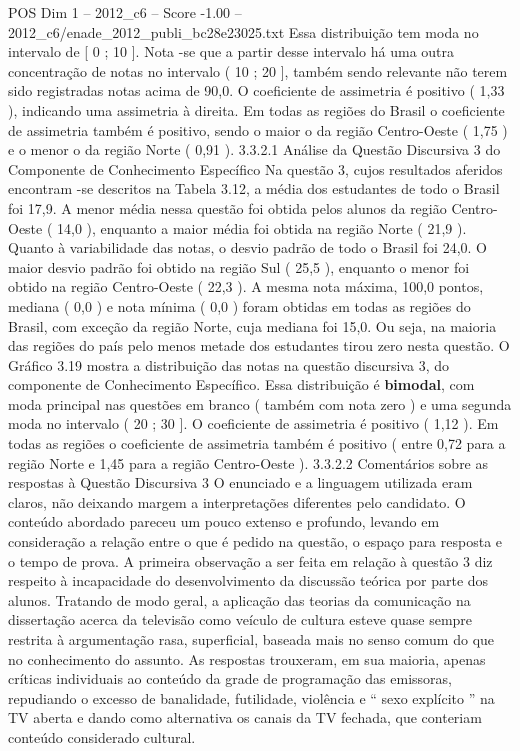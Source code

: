 \begin{textsample}{POS Dim 1 – 2012\_c6 – Score -1.00 – 2012\_c6/enade\_2012\_publi\_bc28e23025.txt}
Essa distribuição tem moda no intervalo de [ 0 ; 10 ].
Nota -se que a partir desse intervalo há uma outra concentração de notas no intervalo ( 10 ; 20 ], também sendo relevante não terem sido registradas notas acima de 90,0.
O coeficiente de assimetria é positivo ( 1,33 ), indicando uma assimetria à direita.
Em todas as regiões do Brasil o coeficiente de assimetria também é positivo, sendo o maior o da região Centro-Oeste ( 1,75 ) e o menor o da região Norte ( 0,91 ). 3.3.2.1 Análise da Questão Discursiva 3 do Componente de Conhecimento Específico Na questão 3, cujos resultados aferidos encontram -se descritos na Tabela 3.12, a média dos estudantes de todo o Brasil foi 17,9.
A menor média nessa questão foi obtida pelos alunos da região Centro-Oeste ( 14,0 ), enquanto a maior média foi obtida na região Norte ( 21,9 ).
Quanto à variabilidade das notas, o desvio padrão de todo o Brasil foi 24,0.
O maior desvio padrão foi obtido na região Sul ( 25,5 ), enquanto o menor foi obtido na região Centro-Oeste ( 22,3 ).
A mesma nota máxima, 100,0 pontos, mediana ( 0,0 ) e nota mínima ( 0,0 ) foram obtidas em todas as regiões do Brasil, com exceção da região Norte, cuja mediana foi 15,0.
Ou seja, na maioria das regiões do país pelo menos metade dos estudantes tirou zero nesta questão.
O Gráfico 3.19 mostra a distribuição das notas na questão discursiva 3, do componente de Conhecimento Específico.
Essa distribuição é \textbf{bimodal}, com moda principal nas questões em branco ( também com nota zero ) e uma segunda moda no intervalo ( 20 ; 30 ].
O coeficiente de assimetria é positivo ( 1,12 ).
Em todas as regiões o coeficiente de assimetria também é positivo ( entre 0,72 para a região Norte e 1,45 para a região Centro-Oeste ). 3.3.2.2 Comentários sobre as respostas à Questão Discursiva 3 O enunciado e a linguagem utilizada eram claros, não deixando margem a interpretações diferentes pelo candidato.
O conteúdo abordado pareceu um pouco extenso e profundo, levando em consideração a relação entre o que é pedido na questão, o espaço para resposta e o tempo de prova.
A primeira observação a ser feita em relação à questão 3 diz respeito à incapacidade do desenvolvimento da discussão teórica por parte dos alunos.
Tratando de modo geral, a aplicação das teorias da comunicação na dissertação acerca da televisão como veículo de cultura esteve quase sempre restrita à argumentação rasa, superficial, baseada mais no senso comum do que no conhecimento do assunto.
As respostas trouxeram, em sua maioria, apenas críticas individuais ao conteúdo da grade de programação das emissoras, repudiando o excesso de banalidade, futilidade, violência e “ sexo explícito ” na TV aberta e dando como alternativa os canais da TV fechada, que conteriam conteúdo considerado cultural.

\end{textsample}
